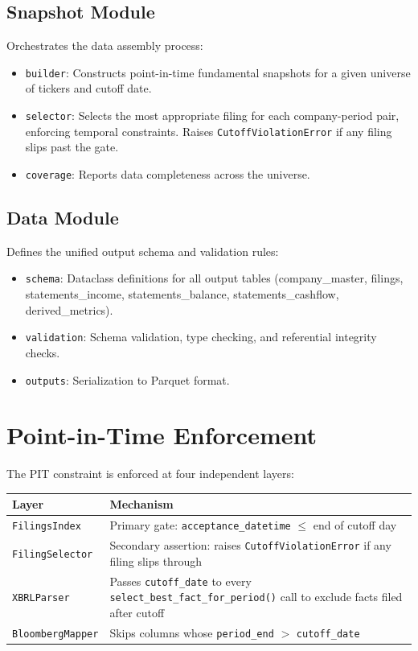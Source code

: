 \documentclass[11pt]{article}
\begin{document}
\subsection{Snapshot Module}
Orchestrates the data assembly process:
\begin{itemize}[nosep]
    \item \texttt{builder}: Constructs point-in-time fundamental snapshots for a given universe of tickers and cutoff date.
    \item \texttt{selector}: Selects the most appropriate filing for each company-period pair, enforcing temporal constraints. Raises \texttt{CutoffViolationError} if any filing slips past the gate.
    \item \texttt{coverage}: Reports data completeness across the universe.
\end{itemize}

\subsection{Data Module}
Defines the unified output schema and validation rules:
\begin{itemize}[nosep]
    \item \texttt{schema}: Dataclass definitions for all output tables (company\_master, filings, statements\_income, statements\_balance, statements\_cashflow, derived\_metrics).
    \item \texttt{validation}: Schema validation, type checking, and referential integrity checks.
    \item \texttt{outputs}: Serialization to Parquet format.
\end{itemize}

\section{Point-in-Time Enforcement}

The PIT constraint is enforced at four independent layers:

\begin{table}[H]
\centering
\begin{tabular}{lp{7cm}}
\toprule
\textbf{Layer} & \textbf{Mechanism} \\
\midrule
\texttt{FilingsIndex} & Primary gate: \texttt{acceptance\_datetime} $\leq$ end of cutoff day \\
\texttt{FilingSelector} & Secondary assertion: raises \texttt{CutoffViolationError} if any filing slips through \\
\texttt{XBRLParser} & Passes \texttt{cutoff\_date} to every \texttt{select\_best\_fact\_for\_period()} call to exclude facts filed after cutoff \\
\texttt{BloombergMapper} & Skips columns whose \texttt{period\_end} $>$ \texttt{cutoff\_date} \\
\bottomrule
\end{tabular}
\end{table}
\end{document}
